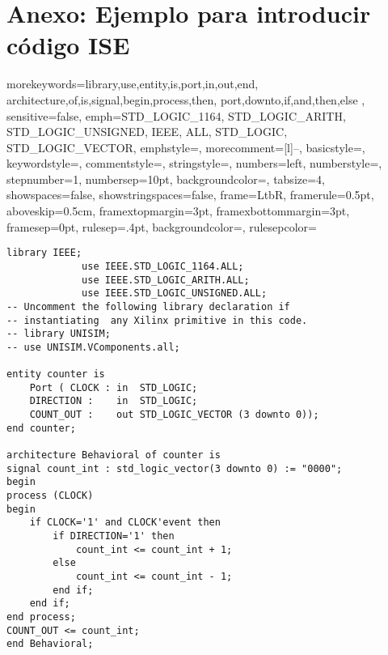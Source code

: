 \chapter*{Anexo: Ejemplo para introducir código ISE}


 {morekeywords={library,use,entity,is,port,in,out,end,
               architecture,of,is,signal,begin,process,then,
               port,downto,if,and,then,else
               },                
sensitive=false,
emph={STD_LOGIC_1164,
STD_LOGIC_ARITH,
STD_LOGIC_UNSIGNED,
IEEE,
ALL,
STD_LOGIC,
STD_LOGIC_VECTOR}, 
emphstyle=\color{magenta},
morecomment=[l]{--},
basicstyle=\small \ttfamily,
   keywordstyle=\color{blue},
   commentstyle=\color{webgreen},
   stringstyle=\color{webtinto},
   numbers=left,
   numberstyle=\tiny\color{gray},
   stepnumber=1,
   numbersep=10pt,
   backgroundcolor=\color{white},
   tabsize=4,
   showspaces=false,
   showstringspaces=false,
%
   frame=LtbR,
     framerule=0.5pt,
     aboveskip=0.5cm,
     framextopmargin=3pt,
     framexbottommargin=3pt,
     framesep=0pt,
     rulesep=.4pt,
     backgroundcolor=\color{gray96},
     rulesepcolor=\color{black}
     }


\renewcommand{\baselinestretch}{1}
 \begin{lstlisting}[language=ISE]
library IEEE;
             use IEEE.STD_LOGIC_1164.ALL;
             use IEEE.STD_LOGIC_ARITH.ALL;
             use IEEE.STD_LOGIC_UNSIGNED.ALL;
-- Uncomment the following library declaration if 
-- instantiating  any Xilinx primitive in this code.
-- library UNISIM;
-- use UNISIM.VComponents.all;
     
entity counter is
	Port ( CLOCK : in  STD_LOGIC;
   	DIRECTION :    in  STD_LOGIC;
  	COUNT_OUT :    out STD_LOGIC_VECTOR (3 downto 0));
end counter;

architecture Behavioral of counter is
signal count_int : std_logic_vector(3 downto 0) := "0000"; 
begin
process (CLOCK)
begin
	if CLOCK='1' and CLOCK'event then
		if DIRECTION='1' then
			count_int <= count_int + 1;
		else
			count_int <= count_int - 1;
		end if;
	end if;
end process;
COUNT_OUT <= count_int;
end Behavioral;
\end{lstlisting}
\renewcommand{\baselinestretch}{1.5}

